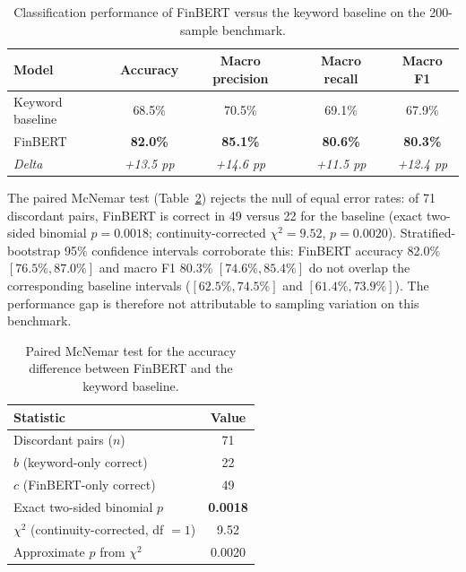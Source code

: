 \documentclass[12pt,a4paper]{article}
\begin{document}
\begin{table}[ht]
\centering
\caption{Classification performance of FinBERT versus the keyword baseline on the
200-sample benchmark.}
\label{tab:summary}
\begin{tabular}{lcccc}
\toprule
\textbf{Model} & \textbf{Accuracy} & \textbf{Macro precision} & \textbf{Macro recall} & \textbf{Macro F1} \\
\midrule
Keyword baseline & 68.5\% & 70.5\% & 69.1\% & 67.9\% \\
FinBERT & \textbf{82.0\%} & \textbf{85.1\%} & \textbf{80.6\%} & \textbf{80.3\%} \\
\midrule
\textit{Delta} & \textit{+13.5 pp} & \textit{+14.6 pp} & \textit{+11.5 pp} & \textit{+12.4 pp} \\
\bottomrule
\end{tabular}
\end{table}

The paired McNemar test (Table~\ref{tab:mcnemar}) rejects the null of equal error
rates: of 71 discordant pairs, FinBERT is correct in 49 versus 22 for the baseline
(exact two-sided binomial $p = 0.0018$; continuity-corrected $\chi^2 = 9.52$,
$p = 0.0020$). Stratified-bootstrap 95\% confidence intervals corroborate this:
FinBERT accuracy 82.0\% $[76.5\%, 87.0\%]$ and macro F1 80.3\% $[74.6\%, 85.4\%]$ do
not overlap the corresponding baseline intervals ($[62.5\%, 74.5\%]$ and
$[61.4\%, 73.9\%]$). The performance gap is therefore not attributable to sampling
variation on this benchmark.

\begin{table}[ht]
\centering
\caption{Paired McNemar test for the accuracy difference between FinBERT and the
keyword baseline.}
\label{tab:mcnemar}
\begin{tabular}{lc}
\toprule
\textbf{Statistic} & \textbf{Value} \\
\midrule
Discordant pairs ($n$) & 71 \\
$b$ (keyword-only correct) & 22 \\
$c$ (FinBERT-only correct) & 49 \\
Exact two-sided binomial $p$ & \textbf{0.0018} \\
$\chi^2$ (continuity-corrected, df $=1$) & 9.52 \\
Approximate $p$ from $\chi^2$ & 0.0020 \\
\bottomrule
\end{tabular}
\end{table}
\end{document}
